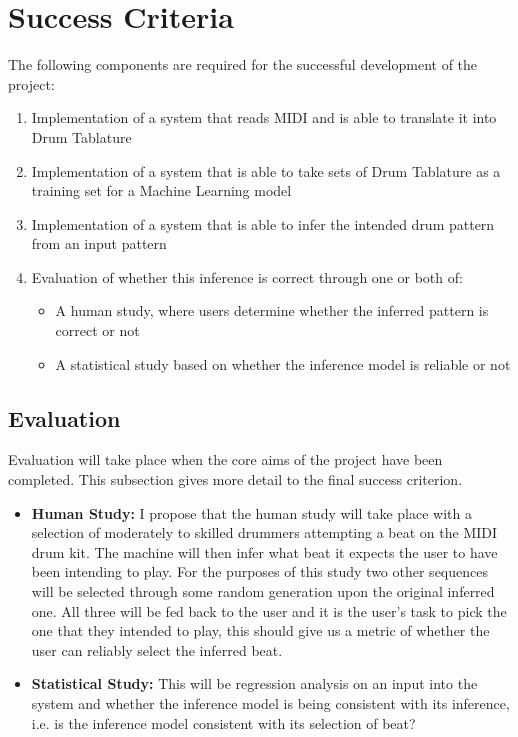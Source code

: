 \documentclass[12pt,a4]{article}
\begin{document}
    \section{Success Criteria}
The following components are required for the successful development of the project:
        \begin{enumerate}
            \item Implementation of a system that reads MIDI and is able to translate it into Drum Tablature
            \item Implementation of a system that is able to take sets of Drum Tablature as a training set for a Machine Learning model
            \item Implementation of a system that is able to infer the intended drum pattern from an input pattern
            \item Evaluation of whether this inference is correct through one or both of:
                \begin{itemize}
                    \item A human study, where users determine whether the inferred pattern is correct or not
                    \item A statistical study based on whether the inference model is reliable or not
                \end{itemize}
        \end{enumerate}
        \subsection{Evaluation}
Evaluation will take place when the core aims of the project have been completed. This subsection gives more detail to the final success criterion.
\begin{itemize}
    \item{\bf Human Study:} I propose that the human study will take place with a selection of moderately to skilled drummers attempting a beat on the MIDI drum kit. The machine will then infer what beat it expects the user to have been intending to play. For the purposes of this study two other sequences will be selected through some random generation upon the original inferred one. All three will be fed back to the user and it is the user's task to pick the one that they intended to play, this should give us a metric of whether the user can reliably select the inferred beat.
    \item{\bf Statistical Study:} This will be regression analysis on an input into the system and whether the inference model is being consistent with its inference, i.e. is the inference model consistent with its selection of beat?
\end{itemize}
\end{document}

